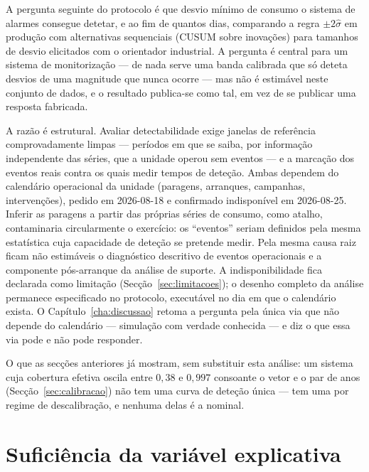 A pergunta seguinte do protocolo é que desvio mínimo de consumo o sistema de alarmes
consegue detetar, e ao fim de quantos dias, comparando a regra
$\pm 2\hat\sigma$ em produção com alternativas sequenciais (CUSUM sobre
inovações) para tamanhos de desvio elicitados com o orientador industrial. A
pergunta é central para um sistema de monitorização --- de nada serve uma
banda calibrada que só deteta desvios de uma magnitude que nunca ocorre ---
mas não é estimável neste conjunto de dados, e o resultado publica-se como
tal, em vez de se publicar uma resposta fabricada.

A razão é estrutural. Avaliar detectabilidade exige janelas de referência
comprovadamente limpas --- períodos em que se saiba, por informação
independente das séries, que a unidade operou sem eventos --- e a marcação
dos eventos reais contra os quais medir tempos de deteção. Ambas dependem do
calendário operacional da unidade (paragens, arranques, campanhas,
intervenções), pedido em 2026-08-18 e confirmado indisponível em 2026-08-25.
Inferir as paragens a partir das próprias séries de consumo, como atalho,
contaminaria circularmente o exercício: os ``eventos'' seriam definidos pela
mesma estatística cuja capacidade de deteção se pretende medir. Pela mesma
causa raiz ficam não estimáveis o diagnóstico descritivo de eventos
operacionais e a componente pós-arranque da análise de suporte. A
indisponibilidade fica declarada como limitação
(Secção~\ref{sec:limitacoes}); o desenho completo da análise permanece
especificado no protocolo, executável no dia em que o calendário exista.
O Capítulo~\ref{cha:discussao} retoma a pergunta pela única via que não
depende do calendário --- simulação com verdade conhecida --- e diz o que
essa via pode e não pode responder.

O que as secções anteriores já mostram, sem substituir esta análise: um sistema cuja
cobertura efetiva oscila entre $0{,}38$ e $0{,}997$ consoante o vetor e o par
de anos (Secção~\ref{sec:calibracao}) não tem uma curva de deteção única
--- tem uma por regime de descalibração, e nenhuma delas é a nominal.


\section{Suficiência da variável explicativa}
\label{sec:suficiencia}


